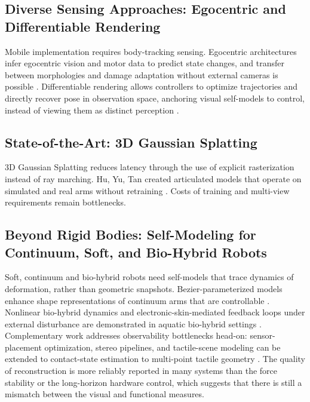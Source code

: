 \documentclass[11pt,a4paper]{article}
\begin{document}
\subsection{Diverse Sensing Approaches: Egocentric and Differentiable Rendering}

Mobile implementation requires body-tracking sensing. Egocentric architectures infer egocentric vision and motor data to predict state changes, and transfer between morphologies and damage adaptation without external cameras is possible \cite{hu2024egocentric}. Differentiable rendering allows controllers to optimize trajectories and directly recover pose in observation space, anchoring visual self-models to control, instead of viewing them as distinct perception \cite{liu2024differentiable}.

\subsection{State-of-the-Art: 3D Gaussian Splatting}

3D Gaussian Splatting reduces latency through the use of explicit rasterization instead of ray marching. Hu, Yu, Tan created articulated models that operate on simulated and real arms without retraining \cite{hu2025learning}. Costs of training and multi-view requirements remain bottlenecks.

\subsection{Beyond Rigid Bodies: Self-Modeling for Continuum, Soft, and Bio-Hybrid Robots}

Soft, continuum and bio-hybrid robots need self-models that trace dynamics of deformation, rather than geometric snapshots. Bezier-parameterized models enhance shape representations of continuum arms that are controllable \cite{yu2024shape}. Nonlinear bio-hybrid dynamics and electronic-skin-mediated feedback loops under external disturbance are demonstrated in aquatic bio-hybrid settings \cite{micklem2026aquatic}. Complementary work addresses observability bottlenecks head-on: sensor-placement optimization, stereo pipelines, and tactile-scene modeling can be extended to contact-state estimation to multi-point tactile geometry \cite{tian2026sensoropt,lee2026tactiverse}. The quality of reconstruction is more reliably reported in many systems than the force stability or the long-horizon hardware control, which suggests that there is still a mismatch between the visual and functional measures.
\end{document}
